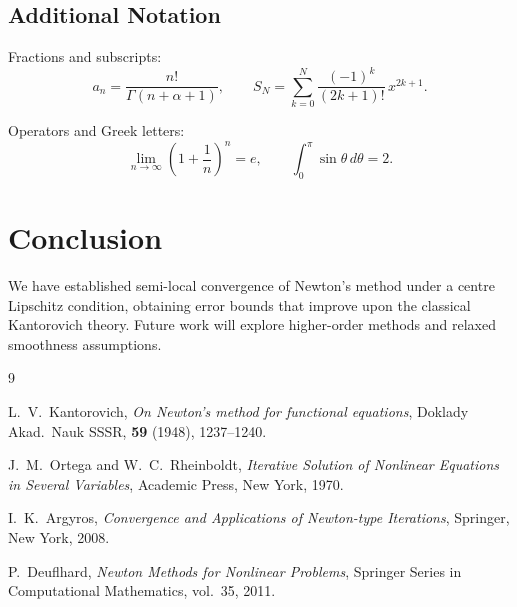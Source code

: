 \documentclass[12pt, a4paper]{article}
\theoremstyle{plain}       %
\theoremstyle{definition}  %
\theoremstyle{remark}      %
\begin{document}
\subsection{Additional Notation}
\label{subsec:notation}

Fractions and subscripts:
\[
    a_{n} = \frac{n!}{\Gamma(n + \alpha + 1)}, \qquad
    S_{N} = \sum_{k=0}^{N} \frac{(-1)^{k}}{(2k+1)!} \, x^{2k+1}.
\]

Operators and Greek letters:
\[
    \lim_{n \to \infty} \left(1 + \frac{1}{n}\right)^{n} = e, \qquad
    \int_{0}^{\pi} \sin\theta \, d\theta = 2.
\]

\section{Conclusion}
\label{sec:conclusion}

We have established semi-local convergence of Newton's method under
a centre Lipschitz condition, obtaining error bounds that improve upon the
classical Kantorovich theory.  Future work will explore higher-order methods
and relaxed smoothness assumptions.

\begin{thebibliography}{9}

    L.~V.~Kantorovich,
    \emph{On Newton's method for functional equations},
    Doklady Akad.\ Nauk SSSR, \textbf{59} (1948), 1237--1240.

    J.~M.~Ortega and W.~C.~Rheinboldt,
    \emph{Iterative Solution of Nonlinear Equations in Several Variables},
    Academic Press, New York, 1970.

    I.~K.~Argyros,
    \emph{Convergence and Applications of Newton-type Iterations},
    Springer, New York, 2008.

    P.~Deuflhard,
    \emph{Newton Methods for Nonlinear Problems},
    Springer Series in Computational Mathematics, vol.~35, 2011.

\end{thebibliography}
\end{document}

